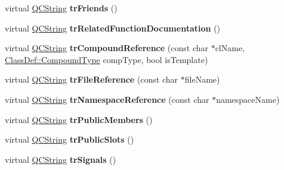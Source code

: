 \begin{DoxyCompactItemize}
\item 
\hypertarget{class_translator_swedish_a77493be94d937cfe7458c6317d792eb6}{virtual \hyperlink{class_q_c_string}{Q\-C\-String} {\bfseries tr\-Friends} ()}\label{class_translator_swedish_a77493be94d937cfe7458c6317d792eb6}

\item 
\hypertarget{class_translator_swedish_a5b5913d0d888aaca721ef5a67333bad1}{virtual \hyperlink{class_q_c_string}{Q\-C\-String} {\bfseries tr\-Related\-Function\-Documentation} ()}\label{class_translator_swedish_a5b5913d0d888aaca721ef5a67333bad1}

\item 
\hypertarget{class_translator_swedish_ae4c559d830de6436ef53c6ebcc3b1849}{virtual \hyperlink{class_q_c_string}{Q\-C\-String} {\bfseries tr\-Compound\-Reference} (const char $\ast$cl\-Name, \hyperlink{class_class_def_a768a6f0a6fd7e9087ff7971abbcc3f36}{Class\-Def\-::\-Compound\-Type} comp\-Type, bool is\-Template)}\label{class_translator_swedish_ae4c559d830de6436ef53c6ebcc3b1849}

\item 
\hypertarget{class_translator_swedish_ab97b8df22dd810e2260a8cb9b06febbb}{virtual \hyperlink{class_q_c_string}{Q\-C\-String} {\bfseries tr\-File\-Reference} (const char $\ast$file\-Name)}\label{class_translator_swedish_ab97b8df22dd810e2260a8cb9b06febbb}

\item 
\hypertarget{class_translator_swedish_a6014867d291ed13bd505e90304b3f7ba}{virtual \hyperlink{class_q_c_string}{Q\-C\-String} {\bfseries tr\-Namespace\-Reference} (const char $\ast$namespace\-Name)}\label{class_translator_swedish_a6014867d291ed13bd505e90304b3f7ba}

\item 
\hypertarget{class_translator_swedish_aa766ee4ea863124dbd2c2cbfe8f615f6}{virtual \hyperlink{class_q_c_string}{Q\-C\-String} {\bfseries tr\-Public\-Members} ()}\label{class_translator_swedish_aa766ee4ea863124dbd2c2cbfe8f615f6}

\item 
\hypertarget{class_translator_swedish_a00352dfc34ae1206bd8572a9c477b8df}{virtual \hyperlink{class_q_c_string}{Q\-C\-String} {\bfseries tr\-Public\-Slots} ()}\label{class_translator_swedish_a00352dfc34ae1206bd8572a9c477b8df}

\item 
\hypertarget{class_translator_swedish_a33921a62881c1973ef5bd381a6e982a4}{virtual \hyperlink{class_q_c_string}{Q\-C\-String} {\bfseries tr\-Signals} ()}\label{class_translator_swedish_a33921a62881c1973ef5bd381a6e982a4}


\end{DoxyCompactItemize}
